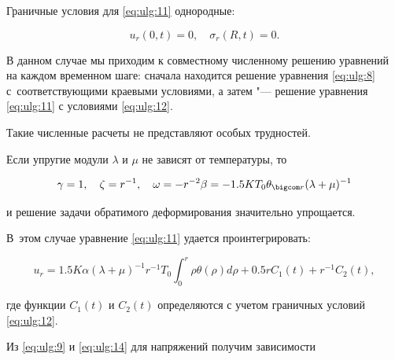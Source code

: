 Граничные условия для \eqref{eq:ulg:11} однородные:

\begin{equation} 

\label{eq:ulg:12} 

u_{r} (0, t )=0, \quad  

\sigma _{r} (R,t)=0.

\end{equation} 

 

В данном случае мы приходим к совместному численному решению уравнений на каждом временном шаге: сначала находится решение уравнения  \eqref{eq:ulg:8} с~соответствующими краевыми условиями, а затем "--- решение уравнения  \eqref{eq:ulg:11} с условиями \eqref{eq:ulg:12}.

Такие численные расчеты не представляют особых трудностей.

 

Если упругие модули $\lambda $ и $\mu $ не зависят от температуры, то 

 \begin{equation} 

 \label{eq:ulg:13} 

 \gamma =1, \quad 

 \zeta =r^{-1} , \quad  

 \omega =-r^{-2} \beta =-1.5KT_{0}\theta _{\bigcom r} (\lambda +\mu )^{-1} 

 \end{equation} 

и решение задачи обратимого деформирования значительно упрощается. \linebreak

В~этом случае уравнение \eqref{eq:ulg:11} удается проинтегрировать:

\begin{equation} 

\label{eq:ulg:14} 

u_{r} =1.5K\alpha (\lambda +\mu )^{-1} r^{-1} T_{0} 

\int _{0}^{r}\rho \theta (\rho )d\rho  +

0.5r C_{1} (t)+ r^{-1} C_{2} (t), 

\end{equation}  

где функции $C_{1}(t)$ и $C_{2}(t)$ определяются с учетом граничных условий \eqref{eq:ulg:12}. 

Из \eqref{eq:ulg:9} и \eqref{eq:ulg:14} для напряжений получим зависимости

